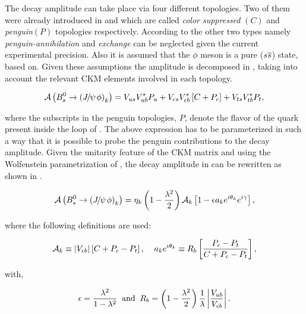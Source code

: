The \BsJpsiPhi decay amplitude can take place via four different topologies.
Two of them were already introduced in  and  which are called {\it color suppressed }$(C)$ and {\it penguin}$(P)$
topologies respectively. According to\cite{DeBruyn-thesis} the other two types namely {\it penguin-annihilation} and {\it exchange} can be neglected
given the current experimental precision. Also it is assumed that the $\phi$ meson is a pure ($s\overline {s}$) state, based on\cite{Faller:2008gt}.
Given these assumptions the \BsJpsiPhi amplitude is decomposed in , taking into account the relevant CKM elements involved in each topology.

\begin{equation}
\mathcal{A} \left( B^0_s\rightarrow \left({J\mskip -3mu/\mskip -2mu\psi\mskip 2mu} \phi\right)_{k} \right) = V_{us}V_{ub}^*P_{u} + V_{cs}V_{cb}^*\left[ C +P_{c} \right] + V_{ts}V_{tb}^*P_{t},
 \label{bsjpsiphi_amp}
\end{equation}

\noindent where the subscripts in the penguin topologies, $P$, denote the flavor of the quark present inside the loop of .
The above expression has to be parameterized in such a way that it is possible to probe the penguin contributions to
the \BsJpsiPhi decay amplitude. Given the unitarity feature of the CKM matrix and using the Wolfenstein parametrization
of , the decay amplitude in  can be rewritten as shown in .

\begin{equation}
  \mathcal{A} \left( B^0_s\rightarrow \left({J\mskip -3mu/\mskip -2mu\psi\mskip 2mu} \phi\right)_{k} \right) = \eta_k  \left( 1-\frac{\lambda^2}{2} \right) \mathcal{A}_{k} \left[  1 - \epsilon a_k e^{i\theta_k} e^{i\gamma}  \right],
 \label{bsjpsiphi_amp_param}
\end{equation}

\noindent where the following definitions are used:

\begin{equation}
  \mathcal{A}_{k} \equiv |V_{cb}| \left[ C + P_c - P_t \right], \;\;\;\; a_k e^{i\theta_k} \equiv R_b \left[  \frac{P_c - P_t}{C + P_c - P_t}  \right],
  \label{bsjpsiphi_amp_param_defs}
\end{equation}

\noindent with,

\begin{equation}
  \epsilon = \frac{\lambda^2}{1-\lambda^2} \;\;\text{and} \;\;  R_b = \left( 1-\frac{\lambda^2}{2} \right) \frac{1}{\lambda} \left| \frac{V_{ub}}{V_{cb}} \right|.
  \label{bsjpsiphi_amp_param_defs_II}
\end{equation}


